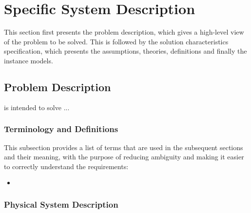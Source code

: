 \documentclass[12pt]{article}
\begin{document}
\section{Specific System Description}

This section first presents the problem description, which gives a high-level
view of the problem to be solved.  This is followed by the solution characteristics
specification, which presents the assumptions, theories, definitions and finally
the instance models.  

\subsection{Problem Description} \label{Sec_pd}

\progname{} is intended to solve ... 

\subsubsection{Terminology and  Definitions}


This subsection provides a list of terms that are used in the subsequent
sections and their meaning, with the purpose of reducing ambiguity and making it
easier to correctly understand the requirements:

\begin{itemize}

\item 

\end{itemize}

\subsubsection{Physical System Description} \label{sec_phySystDescrip}
\end{document}
